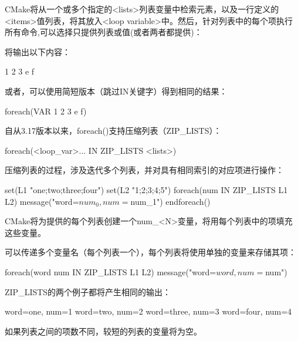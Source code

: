 CMake将从一个或多个指定的<lists>列表变量中检索元素，以及一行定义的<items>值列表，将其放入<loop variable>中。然后，针对列表中的每个项执行所有命令,可以选择只提供列表或值(或者两者都提供)：



将输出以下内容：

\begin{shell}
1
2
3
e
f
\end{shell}

或者，可以使用简短版本（跳过IN关键字）得到相同的结果：

\begin{cmake}
foreach(VAR 1 2 3 e f)
\end{cmake}

自从3.17版本以来，foreach()支持压缩列表（ZIP\_LISTS）：

\begin{shell}
foreach(<loop_var>... IN ZIP_LISTS <lists>)
\end{shell}

压缩列表的过程，涉及迭代多个列表，并对具有相同索引的对应项进行操作：


\begin{cmake}
set(L1 "one;two;three;four")
set(L2 "1;2;3;4;5")
foreach(num IN ZIP_LISTS L1 L2)
    message("word=${num_0}, num=${num_1}")
endforeach()
\end{cmake}

CMake将为提供的每个列表创建一个num\_<N>变量，将用每个列表中的项填充这些变量。

可以传递多个变量名（每个列表一个），每个列表将使用单独的变量来存储其项：

\begin{cmake}
foreach(word num IN ZIP_LISTS L1 L2)
    message("word=${word}, num=${num}")
\end{cmake}

ZIP\_LISTS的两个例子都将产生相同的输出：

\begin{shell}
word=one, num=1
word=two, num=2
word=three, num=3
word=four, num=4
\end{shell}

如果列表之间的项数不同，较短的列表的变量将为空。

